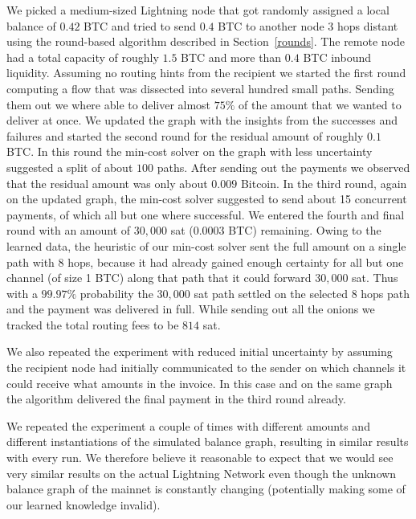 \documentclass[10pt,twocolumn]{article}
\begin{document}
We picked a medium-sized Lightning node that got randomly assigned a local balance of $0.42$ BTC and tried to send $0.4$ BTC to another node $3$ hops distant using the round-based algorithm described in Section~\ref{rounds}.
The remote node had a total capacity of roughly $1.5$ BTC and more than $0.4$ BTC inbound liquidity. 
Assuming no routing hints from the recipient we started the first round computing a flow that was dissected into several hundred small paths.
Sending them out we where able to deliver almost $75\%$ of the amount that we wanted to deliver at once.
We updated the graph with the insights from the successes and failures and started the second round for the residual amount of roughly $0.1$ BTC.
In this round the min-cost solver on the graph with less uncertainty suggested a split of about $100$ paths.
After sending out the payments we observed that the residual amount was only about $0.009$ Bitcoin.
In the third round, again on the updated graph, the min-cost solver suggested to send about 15 concurrent payments, of which all but one where successful.
We entered the fourth and final round with an amount of $30,000$ sat ($0.0003$ BTC) remaining.
Owing to the learned data, the heuristic of our min-cost solver sent the full amount on a single path with $8$ hops, because it had already gained enough certainty for all but one channel (of size 1 BTC) along that path that it could forward $30,000$ sat.
Thus with a $99.97\%$ probability the $30,000$ sat path settled on the selected $8$ hops path and the payment was delivered in full.
While sending out all the onions we tracked the total routing fees to be $814$ sat.

We also repeated the experiment with reduced initial uncertainty by assuming the recipient node had initially communicated to the sender on which channels it could receive what amounts in the invoice.
In this case and on the same graph the algorithm delivered the final payment in the third round already.

We repeated the experiment a couple of times with different amounts and different instantiations of the simulated balance graph, resulting in similar results with every run. We therefore believe it reasonable to expect that we would see very similar results on the actual Lightning Network even though the unknown balance graph of the mainnet is constantly changing (potentially making some of our learned knowledge invalid).
\end{document}
